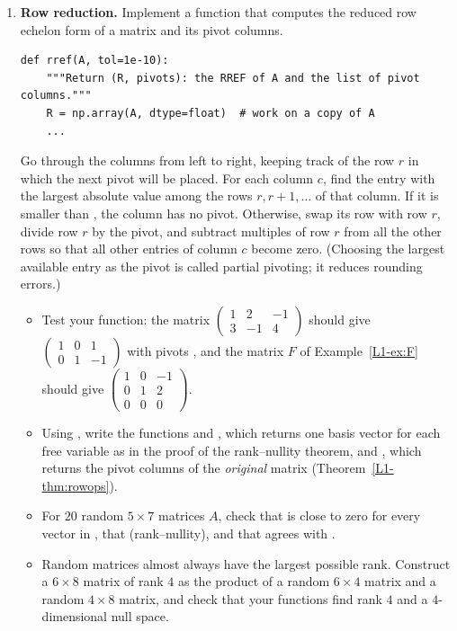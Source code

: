 \begin{enumerate}[label=\textbf{P\arabic*.}, leftmargin=*]
    \item \homework{} \textbf{Row reduction.} Implement a function that computes the reduced row echelon form of a matrix and its pivot columns.
\begin{lstlisting}
def rref(A, tol=1e-10):
    """Return (R, pivots): the RREF of A and the list of pivot columns."""
    R = np.array(A, dtype=float)  # work on a copy of A
    ...
\end{lstlisting}
    Go through the columns from left to right, keeping track of the row $r$ in which the next pivot will be placed. For each column $c$, find the entry with the largest absolute value among the rows $r, r+1, \ldots$ of that column. If it is smaller than , the column has no pivot. Otherwise, swap its row with row $r$, divide row $r$ by the pivot, and subtract multiples of row $r$ from all the other rows so that all other entries of column $c$ become zero. (Choosing the largest available entry as the pivot is called partial pivoting; it reduces rounding errors.)
    \begin{itemize}
        \item Test your function: the matrix $\begin{pmatrix} 1 & 2 & -1 \\ 3 & -1 & 4 \end{pmatrix}$ should give $\begin{pmatrix} 1 & 0 & 1 \\ 0 & 1 & -1 \end{pmatrix}$ with pivots \py{[0, 1]}, and the matrix $F$ of Example~\ref{L1-ex:F} should give $\begin{pmatrix} 1 & 0 & -1 \\ 0 & 1 & 2 \\ 0 & 0 & 0 \end{pmatrix}$.
        \item Using , write the functions  and , which returns one basis vector for each free variable as in the proof of the rank--nullity theorem, and , which returns the pivot columns of the \emph{original} matrix (Theorem~\ref{L1-thm:rowops}).
        \item For $20$ random $5 \times 7$ matrices $A$, check that  is close to zero for every vector  in , that  (rank--nullity), and that  agrees with .
        \item Random matrices almost always have the largest possible rank. Construct a $6 \times 8$ matrix of rank $4$ as the product of a random $6 \times 4$ matrix and a random $4 \times 8$ matrix, and check that your functions find rank $4$ and a $4$-dimensional null space.
    \end{itemize}


\end{enumerate}
